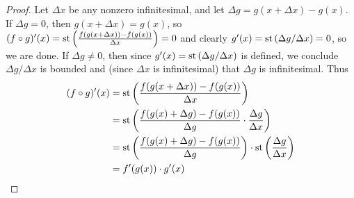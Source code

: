 \begin{proof}
    Let $\Delta x$ be any nonzero infinitesimal, and let $\Delta g = g(x + \Delta x) - g(x)$. If $\Delta g = 0$, then $g(x + \Delta x) = g(x)$, so $(f \circ g)'(x) = \operatorname{st}\left(\frac{f(g(x + \Delta x)) - f(g(x))}{\Delta x}\right) = 0$ and clearly $g'(x) = \operatorname{st}\left(\Delta g / \Delta x\right) = 0$, so we are done. If $\Delta g \neq 0$, then since $g'(x) = \operatorname{st}\left(\Delta g / \Delta x\right)$ is defined, we conclude $\Delta g / \Delta x$ is bounded and (since $\Delta x$ is infinitesimal) that $\Delta g$ is infinitesimal. Thus
\begin{align*}
    (f \circ g)'(x) &= \operatorname{st}\left(\frac{f(g(x + \Delta x)) - f(g(x))}{\Delta x}\right) \\
        &= \operatorname{st}\left(\frac{f(g(x) + \Delta g) - f(g(x))}{\Delta g} \cdot \frac{\Delta g}{\Delta x}\right) \\
        &= \operatorname{st}\left(\frac{f(g(x) + \Delta g) - f(g(x))}{\Delta g}\right) \cdot \operatorname{st}\left(\frac{\Delta g}{\Delta x}\right) \\
        &= f'(g(x)) \cdot g'(x)
\end{align*}
\end{proof}